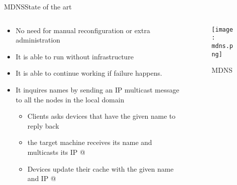 \begin{frame}{MDNS}{State of the art}
	\begin{columns}
	
		\begin{column}{0.6\textwidth}
			\begin{itemize}
				\item No need for manual reconfiguration or extra administration
				\item It is able to run without infrastructure
				\item It is able to continue working if failure happens.
				
				\item It inquires names by sending an IP multicast message to all the nodes in the local domain
					\begin{itemize}
						\item Clients asks devices that have the given name to reply back
						\item the target machine receives its name and multicasts its IP @
						\item Devices update their cache with the given name and IP @
					\end{itemize}
				
			\end{itemize}
		\end{column}
		
		\begin{column}{0.4\textwidth}
			\begin{center}
			
				\begin{figure}
					\texttt{[image: mdns.png]}
					\caption{\label{fig:mdns} MDNS}
				\end{figure}
				
			\end{center}
			
		\end{column}
	\end{columns}
	
\end{frame}

